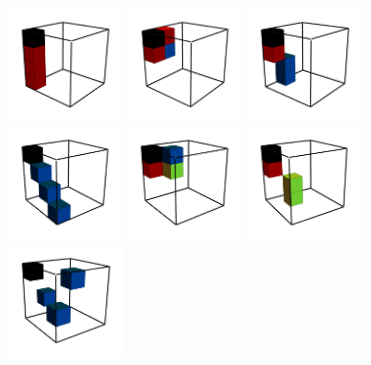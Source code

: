 \documentclass[11pt,dvipsnames]{article} %
\newcommand{\1}{\mathds{1}}
\begin{document}
\begin{figure}[H]
	\centering
	\hfill \hfill
	\includegraphics[height=3cm]{3q-4c-si-1}
	\hfill
	\includegraphics[height=3cm]{3q-4c-si-2}
	\hfill
	\includegraphics[height=3cm]{3q-4c-si-3}
	\hfill
	\includegraphics[height=3cm]{3q-4c-si-4}
	\hfill
	\includegraphics[height=3cm]{3q-4c-si-5}
	\hfill
	\vfill
	\hfill
	\includegraphics[height=3cm]{3q-4c-no-1}
	\hfill
	\includegraphics[height=3cm]{3q-4c-no-2}

\end{figure}
\end{document}
